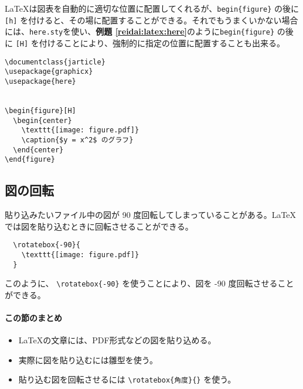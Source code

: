 \LaTeX は図表を自動的に適切な位置に配置してくれるが、\verb|begin{figure}| の後に \texttt{[h]} を付けると、その場に配置することができる。それでもうまくいかない場合には、\texttt{here.sty}を使い、\textbf{例題 \ref{reidai:latex:here}}のように\verb|begin{figure}| の後に \texttt{[H]} を付けることにより、強制的に指定の位置に配置することも出来る。
\begin{reidai}
\label{reidai:latex:here}
\begin{verbatim}
\documentclass{jarticle}
\usepackage{graphicx}
\usepackage{here}


\begin{figure}[H]
  \begin{center}
    \texttt{[image: figure.pdf]}
    \caption{$y = x^2$ のグラフ}
  \end{center}
\end{figure}

\end{verbatim}
\end{reidai}

\subsection{図の回転}
\label{sec:latex:rotate_pdf}

貼り込みたいファイル中の図が 90 度回転してしまっていることがある。\LaTeX では図を貼り込むときに回転させることができる。
\begin{reidai}
\begin{verbatim}
  \rotatebox{-90}{
    \texttt{[image: figure.pdf]}
  }
\end{verbatim}
\end{reidai} \noindent
\vspace*{-1.5em}
\begin{kekka}
  \begin{center}
  \end{center}
\end{kekka} \noindent
このように、 \verb|\rotatebox{-90}| を使うことにより、図を -90 度回転させることができる。


\paragraph{この節のまとめ}

\begin{itemize}
\item \LaTeX の文章には、PDF形式などの図を貼り込める。
\item 実際に図を貼り込むには雛型を使う。
\item 貼り込む図を回転させるには \verb|\rotatebox{角度}{}| を使う。
\end{itemize}

